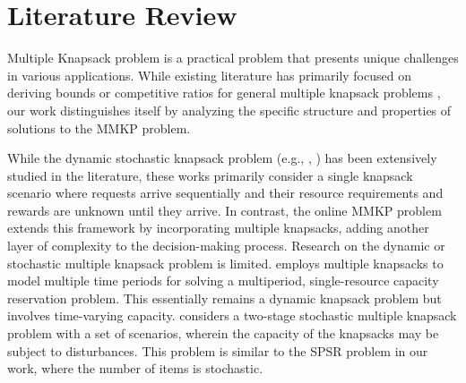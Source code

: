 \section{Literature Review}\label{literature}

Multiple Knapsack problem \citep{martello1990knapsack} is a practical problem that presents unique challenges in various applications. While existing literature has primarily focused on deriving bounds or competitive ratios for general multiple knapsack problems \citep{khuri1994zero, ferreira1996solving, pisinger1999exact, chekuri2005polynomial}, our work distinguishes itself by analyzing the specific structure and properties of solutions to the MMKP problem. 



While the dynamic stochastic knapsack problem (e.g., \citet{kleywegt1998dynamic, kleywegt2001dynamic}, \citet{papastavrou1996dynamic}) has been extensively studied in the literature, these works primarily consider a single knapsack scenario where requests arrive sequentially and their resource requirements and rewards are unknown until they arrive. In contrast, the online MMKP problem extends this framework by incorporating multiple knapsacks, adding another layer of complexity to the decision-making process.
Research on the dynamic or stochastic multiple knapsack problem is limited. \citet{perry2009approximate} employs multiple knapsacks to model multiple time periods for solving a multiperiod, single-resource capacity reservation problem. This essentially remains a dynamic knapsack problem but involves time-varying capacity. \citet{tonissen2017column} considers a two-stage stochastic multiple knapsack problem with a set of scenarios, wherein the capacity of the knapsacks may be subject to disturbances. This problem is similar to the SPSR problem in our work, where the number of items is stochastic.


